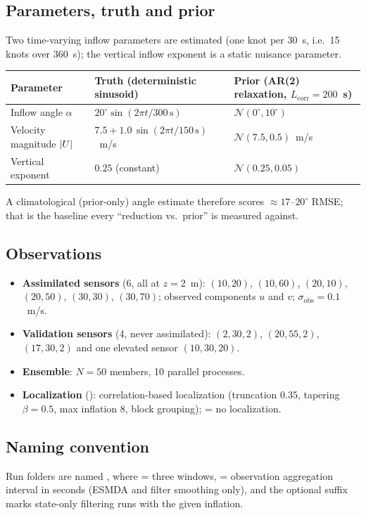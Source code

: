 \subsection{Parameters, truth and prior}
Two time-varying inflow parameters are estimated (one knot per 30~s, i.e.\ 15 knots over
360~s); the vertical inflow exponent is a static nuisance parameter.
\begin{center}\small
\begin{tabular}{lll}
\toprule
Parameter & Truth (deterministic sinusoid) & Prior (AR(2) relaxation, $L_\mathrm{corr}=200$~s) \\
\midrule
Inflow angle $\alpha$ & $20^\circ\sin(2\pi t/300\,\mathrm{s})$ & $\mathcal N(0^\circ, 10^\circ)$ \\
Velocity magnitude $|U|$ & $7.5 + 1.0\,\sin(2\pi t/150\,\mathrm{s})$~m/s & $\mathcal N(7.5, 0.5)$~m/s \\
Vertical exponent & $0.25$ (constant) & $\mathcal N(0.25, 0.05)$ \\
\bottomrule
\end{tabular}
\end{center}
A climatological (prior-only) angle estimate therefore scores $\approx 17$--$20^\circ$
RMSE; that is the baseline every ``reduction vs.\ prior'' is measured against.

\subsection{Observations}
\begin{itemize}[nosep]
  \item \textbf{Assimilated sensors} (6, all at $z=2$~m): $(10,20)$, $(10,60)$, $(20,10)$,
        $(20,50)$, $(30,30)$, $(30,70)$; observed components $u$ and $v$;
        $\sigma_\mathrm{obs}=0.1$~m/s.
  \item \textbf{Validation sensors} (4, never assimilated): $(2,30,2)$, $(20,55,2)$,
        $(17,30,2)$ and one elevated sensor $(10,30,20)$.
  \item \textbf{Ensemble}: $N=50$ members, 10 parallel processes.
  \item \textbf{Localization} (): correlation-based localization
        (truncation 0.35, tapering $\beta=0.5$, max inflation 8, block grouping);
         = no localization.
\end{itemize}

\subsection{Naming convention}
Run folders are named
, where
 = three windows,  = observation aggregation interval in
seconds (ESMDA and filter smoothing only), and the optional  suffix marks
state-only filtering runs with the given inflation.


